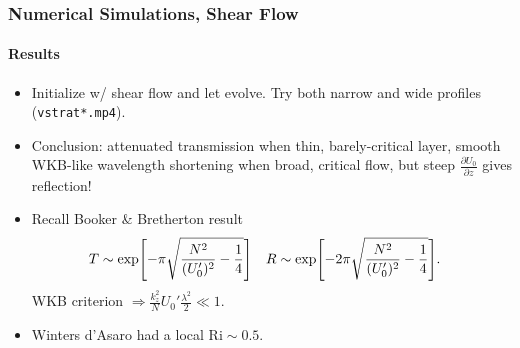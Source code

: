\documentclass[dvipsnames]{beamer}
\newcommand*{\pd}[2]{\frac{\partial#1}{\partial#2}}
\DeclarePairedDelimiter\s{\lbrack}{\rbrack}
\begin{document}
\begin{frame}
    \frametitle{Numerical Simulations, Shear Flow}
    \framesubtitle{Results}

    \begin{itemize}
        \item Initialize w/ shear flow and let evolve. Try both narrow and wide
            profiles (\lstinline{vstrat*.mp4}).

        \item Conclusion: attenuated transmission when thin, barely-critical
            layer, smooth WKB-like wavelength shortening when broad, critical
            flow, but steep $\pd{U_0}{z}$ gives reflection!

        \item Recall Booker \& Bretherton result
            \begin{align}
                T &\sim \exp\s*{-\pi \sqrt{\frac{N^2}{(U_0')^2} - \frac{1}{4}}}
                & R &\sim
                    \exp\s*{-2\pi \sqrt{\frac{N^2}{(U_0')^2} - \frac{1}{4}}}.
            \end{align}
            WKB criterion $\Rightarrow \frac{k_z^2}{N}U_0' \frac{\lambda^2}{2}
            \ll 1$.

        \item Winters d'Asaro had a local $\mathrm{Ri} \sim 0.5$.
    \end{itemize}
\end{frame}
\end{document}
